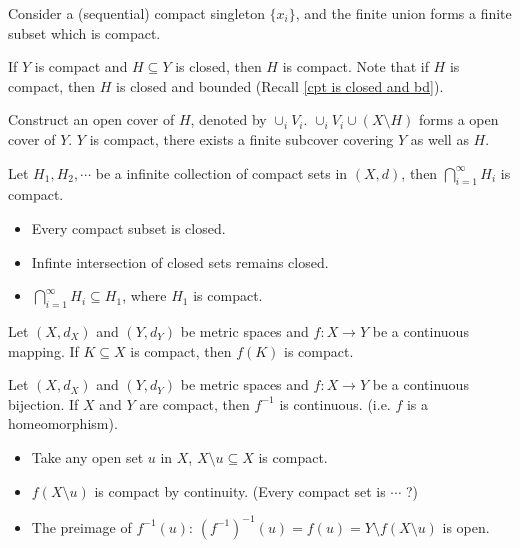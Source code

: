 \documentclass[12pt]{article}
\begin{document}
\begin{pfbox}
    Consider a (sequential) compact singleton $\{x_i\}$, and the finite union forms a finite subset which is compact.
\end{pfbox}

\begin{theorem}
    If $Y$ is compact and $H\subseteq Y$ is closed, then $H$ is compact.
    Note that if $H$ is compact, then $H$ is closed and bounded (Recall \eqref{cpt is closed and bd}).
\end{theorem}

\begin{pfbox}
    Construct an open cover of $H$, denoted by $\cup_i V_i$. $\cup_i V_i\cup (X\setminus H)$ forms a open cover of $Y$.
    $Y$ is compact, there exists a finite subcover covering $Y$ as well as $H$.
\end{pfbox}


\begin{theorem}
    Let $H_1,H_2,\cdots$ be a infinite collection of compact sets in $(X,d)$, then $\bigcap^{\infty}_{i=1}H_i$ is compact.
\end{theorem}
 
\begin{pfbox}
    \begin{itemize}
        \item  Every compact subset is closed.
        \item  Infinte intersection of closed sets remains closed.
        \item  $\bigcap^{\infty}_{i=1}H_i\subseteq H_1$, where $H_1$ is compact.
    \end{itemize}
\end{pfbox}

\begin{theorem}
    Let $(X,d_X)$ and $(Y,d_Y)$ be metric spaces and $f:X\rightarrow Y$ be a continuous mapping.
    If $K\subseteq X$ is compact, then $f(K)$ is compact.
\end{theorem}


\begin{theorem}
    Let $(X,d_X)$ and $(Y,d_Y)$ be metric spaces and $f:X\rightarrow Y$ be a continuous bijection.
    If $X$ and $Y$ are compact, then $f^{-1}$ is continuous. (i.e. $f$ is a homeomorphism).
\end{theorem}

\begin{pfbox}
    \begin{itemize}
        \item Take any open set $u$ in $X$, $X\setminus u\subseteq X$ is compact.
        \item $f(X\setminus u)$ is compact by continuity. (Every compact set is $\cdots$ ?)
        \item The preimage of $f^{-1}(u)$: $(f^{-1})^{-1}(u)=f(u) = Y\setminus f(X\setminus u)$ is open.
    \end{itemize}
\end{pfbox}
\end{document}
